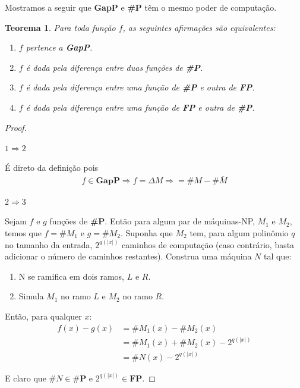 \documentclass[paper=a4, fontsize=11pt]{scrartcl} %
\newtheorem{theorem}{Teorema}
\numberwithin{equation}{subsection}
\numberwithin{figure}{subsection}
\numberwithin{table}{subsection}
\numberwithin{definition}{subsection}
\numberwithin{theorem}{subsection}
\numberwithin{property}{subsection}
\numberwithin{proposition}{subsection}
\newcommand{\SP}{\textbf{\#P}\xspace}
\newcommand{\FP}{\textbf{FP}\xspace}
\newcommand{\gP}{\textbf{GapP}\xspace}
\newcommand{\del}[1]{\Delta #1}
\renewcommand{\bar}[1]{\overline{#1}}
\begin{document}
Mostramos a seguir que \gP e \SP têm o mesmo poder de computação.
\begin{theorem}
Para toda função $f$, as seguintes afirmações são equivalentes:
\begin{enumerate}
  \item $f$ pertence a \gP.
  \item $f$ é dada pela diferença entre duas funções de \SP.
  \item $f$ é dada pela diferença entre uma função de \SP e outra de \FP.
  \item $f$ é dada pela diferença entre uma função de \FP e outra de \SP.
\end{enumerate}
\end{theorem}
\begin{proof} \hfill

\paragraph{$1 \Rightarrow 2$}
É direto da definição pois
\begin{align*}
  f \in \gP \Rightarrow f = \del M \Rightarrow = \# M - \# \bar{M}
\end{align*}

\paragraph{$2 \Rightarrow 3$}
Sejam $f$ e $g$ funções de \SP. Então para algum par de máquinas-NP, $M_1$ e $M_2$, temos que $f = \# M_1$ e $g = \# M_2$. Suponha que $M_2$ tem, para algum polinômio $q$ no tamanho da entrada, $2^{q(|x|)}$ caminhos de computação (caso contrário, basta adicionar o número de caminhos restantes). Construa uma máquina $N$ tal que:
\begin{enumerate}
  \item N se ramifica em dois ramos, $L$ e $R$.
  \item Simula $M_1$ no ramo $L$ e $M_2$ no ramo $R$.
\end{enumerate}

Então, para qualquer $x$:
\begin{align*}
f(x) - g(x) &= \# M_1(x) - \# M_2(x) \\
            &= \# M_1(x) + \# M_2(x) - 2^{q(|x|)} \\
            &= \# N(x) - 2^{q(|x|)}
\end{align*}

E claro que $\# N \in \SP$ e $2^{q(|x|)} \in \FP$. 


\end{proof}
\end{document}
